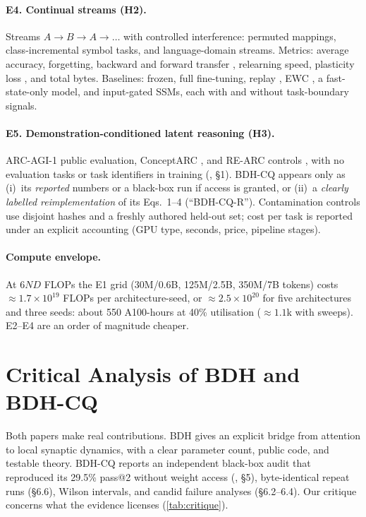 \documentclass[10pt]{article}
\theoremstyle{remark}
\begin{document}
\paragraph{E4. Continual streams (H2).} Streams $A\!\to\!B\!\to\!A\!\to\!\dots$ with controlled interference: permuted
mappings, class-incremental symbol tasks, and language-domain streams. Metrics: average accuracy, forgetting,
backward and forward transfer \citep{lopezpaz2017gem}, relearning speed, plasticity loss \citep{dohare2024loss}, and
total bytes. Baselines: frozen, full fine-tuning, replay \citep{rolnick2019replay}, EWC \citep{kirkpatrick2017ewc}, a
fast-state-only model, and input-gated SSMs, each with and without task-boundary signals.

\paragraph{E5. Demonstration-conditioned latent reasoning (H3).} ARC-AGI-1 public evaluation, ConceptARC
\citep{moskvichev2023conceptarc}, and RE-ARC controls \citep{hodel2024rearc}, with no evaluation tasks or task
identifiers in training (\citealp{engdahl2026bdhcq}, \S1). BDH-CQ appears only as (i)~its \emph{reported} numbers or a
black-box run if access is granted, or (ii)~a \emph{clearly labelled reimplementation} of its Eqs.~1--4
(``BDH-CQ-R''). Contamination controls use disjoint hashes and a freshly authored held-out set; cost per task is
reported under an explicit accounting (GPU type, seconds, price, pipeline stages).

\paragraph{Compute envelope.} At $6ND$ FLOPs the E1 grid (30M/0.6B, 125M/2.5B, 350M/7B tokens) costs
${\approx}1.7\times10^{19}$ FLOPs per architecture-seed, or ${\approx}2.5\times10^{20}$ for five architectures and three
seeds: about 550 A100-hours at 40\% utilisation (${\approx}1.1$k with sweeps). E2--E4 are an order of magnitude cheaper.

\section{Critical Analysis of BDH and BDH-CQ}
\label{sec:critique}

Both papers make real contributions. BDH gives an explicit bridge from attention to local synaptic dynamics, with a
clear parameter count, public code, and testable theory. BDH-CQ reports an independent black-box audit that reproduced
its 29.5\% pass@2 without weight access (\citealp{engdahl2026bdhcq}, \S5), byte-identical repeat runs (\S6.6), Wilson
intervals, and candid failure analyses (\S6.2--6.4). Our critique concerns what the evidence licenses
(\cref{tab:critique}).
\end{document}

